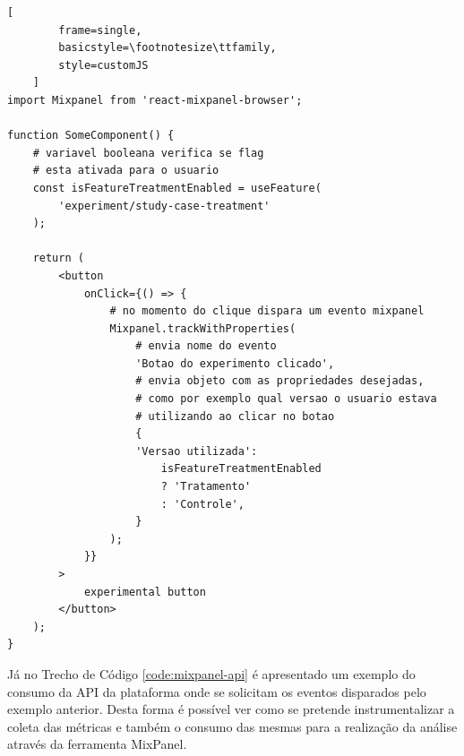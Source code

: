 \begin{code}[!ht]
    \caption{Disparo de Eventos no Mixpanel}
    \begin{lstlisting}[
        frame=single,
        basicstyle=\footnotesize\ttfamily,
        style=customJS
    ]
import Mixpanel from 'react-mixpanel-browser';

function SomeComponent() {
    # variavel booleana verifica se flag
    # esta ativada para o usuario
    const isFeatureTreatmentEnabled = useFeature(
        'experiment/study-case-treatment'
    );

    return (
        <button
            onClick={() => {
                # no momento do clique dispara um evento mixpanel
                Mixpanel.trackWithProperties(
                    # envia nome do evento
                    'Botao do experimento clicado',
                    # envia objeto com as propriedades desejadas,
                    # como por exemplo qual versao o usuario estava
                    # utilizando ao clicar no botao
                    {
                    'Versao utilizada':
                        isFeatureTreatmentEnabled
                        ? 'Tratamento'
                        : 'Controle',
                    }
                );
            }}
        >
            experimental button
        </button>
    );
}
    \end{lstlisting}
    \label{code:mixpanel}
\end{code}

Já no Trecho de Código \ref{code:mixpanel-api} é apresentado um exemplo do consumo da API da plataforma onde se solicitam os eventos disparados pelo exemplo anterior. Desta forma é possível ver como se pretende instrumentalizar a coleta das métricas e também o consumo das mesmas para a realização da análise através da ferramenta MixPanel.

